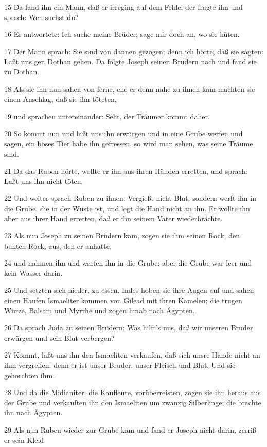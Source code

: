 \par 15 Da fand ihn ein Mann, daß er irreging auf dem Felde; der fragte ihn und sprach: Wen suchst du?
\par 16 Er antwortete: Ich suche meine Brüder; sage mir doch an, wo sie hüten.
\par 17 Der Mann sprach: Sie sind von dannen gezogen; denn ich hörte, daß sie sagten: Laßt uns gen Dothan gehen. Da folgte Joseph seinen Brüdern nach und fand sie zu Dothan.
\par 18 Als sie ihn nun sahen von ferne, ehe er denn nahe zu ihnen kam machten sie einen Anschlag, daß sie ihn töteten,
\par 19 und sprachen untereinander: Seht, der Träumer kommt daher.
\par 20 So kommt nun und laßt uns ihn erwürgen und in eine Grube werfen und sagen, ein böses Tier habe ihn gefressen, so wird man sehen, was seine Träume sind.
\par 21 Da das Ruben hörte, wollte er ihn aus ihren Händen erretten, und sprach: Laßt uns ihn nicht töten.
\par 22 Und weiter sprach Ruben zu ihnen: Vergießt nicht Blut, sondern werft ihn in die Grube, die in der Wüste ist, und legt die Hand nicht an ihn. Er wollte ihn aber aus ihrer Hand erretten, daß er ihn seinem Vater wiederbrächte.
\par 23 Als nun Joseph zu seinen Brüdern kam, zogen sie ihm seinen Rock, den bunten Rock, aus, den er anhatte,
\par 24 und nahmen ihn und warfen ihn in die Grube; aber die Grube war leer und kein Wasser darin.
\par 25 Und setzten sich nieder, zu essen. Indes hoben sie ihre Augen auf und sahen einen Haufen Ismaeliter kommen von Gilead mit ihren Kamelen; die trugen Würze, Balsam und Myrrhe und zogen hinab nach Ägypten.
\par 26 Da sprach Juda zu seinen Brüdern: Was hilft's uns, daß wir unseren Bruder erwürgen und sein Blut verbergen?
\par 27 Kommt, laßt uns ihn den Ismaeliten verkaufen, daß sich unsre Hände nicht an ihm vergreifen; denn er ist unser Bruder, unser Fleisch und Blut. Und sie gehorchten ihm.
\par 28 Und da die Midianiter, die Kaufleute, vorüberreisten, zogen sie ihn heraus aus der Grube und verkauften ihn den Ismaeliten um zwanzig Silberlinge; die brachte ihn nach Ägypten.
\par 29 Als nun Ruben wieder zur Grube kam und fand er Joseph nicht darin, zerriß er sein Kleid

